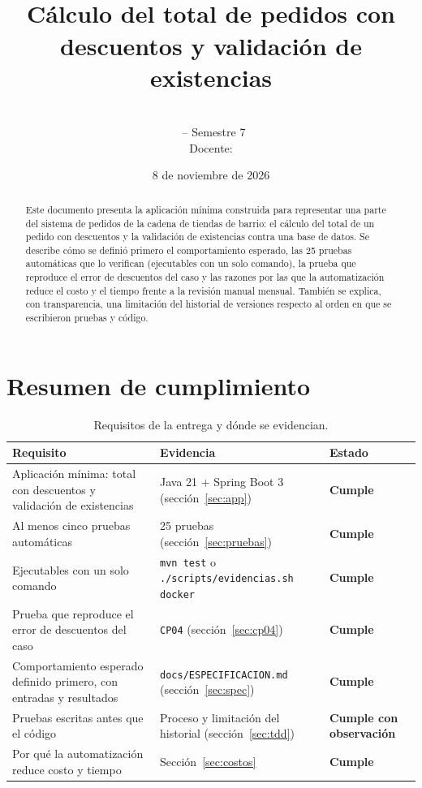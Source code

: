 \documentclass[11pt,a4paper]{article}
\title{\textbf{\entrega}\\[4pt]\large Cálculo del total de pedidos con descuentos y validación de existencias}
\author{\integrantes\\[6pt]\small \curso\ -- Semestre 7\\ \small Docente: \docente}
\date{8 de noviembre de 2026}
\newcommand{\ok}{\textcolor{ok}{\textbf{Cumple}}}
\newcommand{\parcial}{\textcolor{warn}{\textbf{Cumple con observación}}}
\begin{document}
\maketitle

\begin{abstract}
Este documento presenta la aplicación mínima construida para representar una parte del sistema de
pedidos de la cadena de tiendas de barrio: el cálculo del total de un pedido con descuentos y la
validación de existencias contra una base de datos. Se describe cómo se definió primero el
comportamiento esperado, las 25 pruebas automáticas que lo verifican (ejecutables con un solo
comando), la prueba que reproduce el error de descuentos del caso y las razones por las que la
automatización reduce el costo y el tiempo frente a la revisión manual mensual. También se explica,
con transparencia, una limitación del historial de versiones respecto al orden en que se escribieron
pruebas y código.
\end{abstract}

\setcounter{tocdepth}{1}
\tableofcontents
\newpage

\section{Resumen de cumplimiento}

\begin{table}[H]
\centering
\begin{tabularx}{\textwidth}{@{}L L l@{}}
\toprule
\textbf{Requisito} & \textbf{Evidencia} & \textbf{Estado}\\
\midrule
Aplicación mínima: total con descuentos y validación de existencias &
Java 21 + Spring Boot 3 (sección~\ref{sec:app}) & \ok\\
Al menos cinco pruebas automáticas & 25 pruebas (sección~\ref{sec:pruebas}) & \ok\\
Ejecutables con un solo comando & \texttt{mvn test} o \texttt{./scripts/evidencias.sh docker} & \ok\\
Prueba que reproduce el error de descuentos del caso &
\texttt{CP04} (sección~\ref{sec:cp04}) & \ok\\
Comportamiento esperado definido primero, con entradas y resultados &
\texttt{docs/ESPECIFICACION.md} (sección~\ref{sec:spec}) & \ok\\
Pruebas escritas antes que el código & Proceso y limitación del historial (sección~\ref{sec:tdd}) & \parcial\\
Por qué la automatización reduce costo y tiempo & Sección~\ref{sec:costos} & \ok\\
\bottomrule
\end{tabularx}
\caption{Requisitos de la entrega y dónde se evidencian.}
\end{table}
\end{document}
